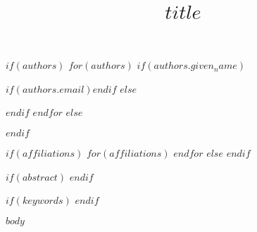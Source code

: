 \documentclass[pdflatex,sn-nature]{sn-jnl}
\begin{document}
\title{$title$}

$if(authors)$
$for(authors)$
$if(authors.given_name)$
\author{ }$if(authors.email)$$endif$
$else$
\author{ }
$endif$
$endfor$
$else$
\author{ \sur{}}
$endif$

$if(affiliations)$
$for(affiliations)$
$endfor$
$else$
$endif$

$if(abstract)$
$endif$

$if(keywords)$
$endif$

\maketitle

$body$



\end{document}
